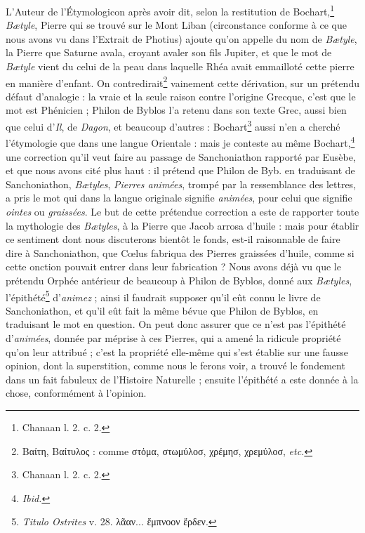 \documentclass[a4paper, 11pt, oneside, polutonikogreek, french, landscape]{article}
\begin{document}
L'Auteur de l'Étymologicon après avoir dit, selon la restitution de Bochart,\footnote{Chanaan l. 2. c. 2.} \emph{Bætyle}, Pierre qui se trouvé sur le Mont Liban (circonstance conforme à ce que nous avons vu dans l'Extrait de Photius) ajoute qu'on appelle du nom de \emph{Bætyle}, la Pierre que Saturne avala, croyant avaler son fils Jupiter, et que le mot de \emph{Bætyle} vient du celui de la peau dans laquelle Rhéa avait emmailloté cette pierre en manière d'enfant. On contredirait\footnote{Βαίτη, Βαίτυλος : comme στὀμα, στωμύλοσ, χρέμησ, χρεμύλοσ, \emph{etc.}} vainement cette dérivation, sur un prétendu défaut d'analogie : la vraie et la seule raison contre l'origine Grecque, c'est que le mot est Phénicien ; Philon de Byblos l'a retenu dans son texte Grec, aussi bien que celui d'\emph{Il}, de \emph{Dagon}, et beaucoup d'autres : Bochart\footnote{Chanaan l. 2. c. 2.} aussi n'en a cherché l'étymologie que dans une langue Orientale : mais je conteste au même Bochart,\footnote{\emph{Ibid.}} une correction qu'il veut faire au passage de Sanchoniathon rapporté par Eusèbe, et que nous avons cité plus haut : il prétend que Philon de Byb. en traduisant de Sanchoniathon, \emph{Bætyles}, \emph{Pierres animées}, trompé par la ressemblance des lettres, a pris le mot qui dans la langue originale signifie \emph{animées}, pour celui que signifie \emph{ointes} ou \emph{graissées}. Le but de cette prétendue correction a este de rapporter toute la mythologie des \emph{Bætyles}, à la Pierre que Jacob arrosa d'huile : mais pour établir ce sentiment dont nous discuterons bientôt le fonds, est-il raisonnable de faire dire à Sanchoniathon, que Cœlus fabriqua des Pierres graissées d'huile, comme si cette onction pouvait entrer dans leur fabrication ? Nous avons déjà vu que le prétendu Orphée antérieur de beaucoup à Philon de Byblos, donné aux \emph{Bætyles}, l'épithété\footnote{\emph{Titulo Ostrites} v. 28. λᾶαν... ἔμπνοον ἔρδεν.} d'\emph{animez} ; ainsi il faudrait supposer qu'il eût connu le livre de Sanchoniathon, et qu'il eût fait la même bévue que Philon de Byblos, en traduisant le mot en question. On peut donc assurer que ce n'est pas l'épithété d'\emph{animées}, donnée par méprise à ces Pierres, qui a amené la ridicule propriété qu'on leur attribué ; c'est la propriété elle-même qui s'est établie sur une fausse opinion, dont la superstition, comme nous le ferons voir, a trouvé le fondement dans un fait fabuleux de l'Histoire Naturelle ; ensuite l'épithété a este donnée à la chose, conformément à l'opinion.
\end{document}
